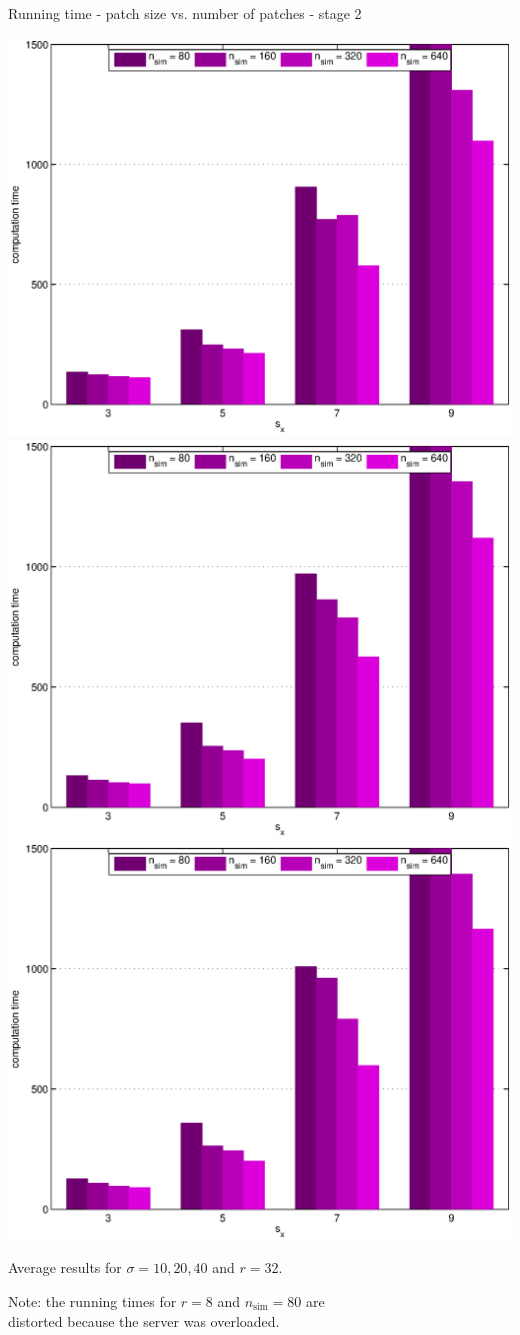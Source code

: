 \documentclass[mathserif, 8pt]{beamer}
\begin{document}
\begin{frame}{Running time - patch size vs. number of patches - stage 2}
	\begin{center}
		\includegraphics[width=.33\textwidth]{time_px2-np2-bars_2r32_s10_average.eps}%
		\includegraphics[width=.33\textwidth]{time_px2-np2-bars_2r32_s20_average.eps}%
		\includegraphics[width=.33\textwidth]{time_px2-np2-bars_2r32_s40_average.eps}
	\end{center}
	\begin{center}
	Average results for $\sigma = 10, 20, 40$ and $r = 32$.

	\bigskip

	Note: the running times for $r = 8$ and $n_{\text{sim}} = 80$ are \\
	distorted because the server was overloaded.
	\end{center}
\end{frame}
\end{document}
